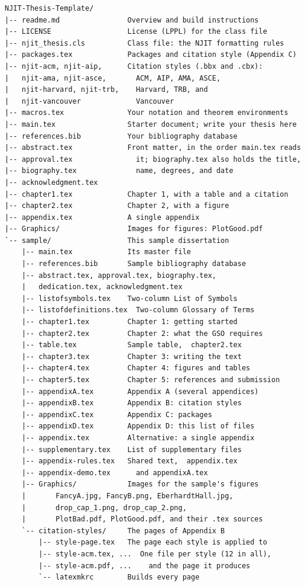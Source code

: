 {\footnotesize
\begin{verbatim}
NJIT-Thesis-Template/
|-- readme.md                Overview and build instructions
|-- LICENSE                  License (LPPL) for the class file
|-- njit_thesis.cls          Class file: the NJIT formatting rules
|-- packages.tex             Packages and citation style (Appendix C)
|-- njit-acm, njit-aip,      Citation styles (.bbx and .cbx):
|   njit-ama, njit-asce,       ACM, AIP, AMA, ASCE,
|   njit-harvard, njit-trb,    Harvard, TRB, and
|   njit-vancouver             Vancouver
|-- macros.tex               Your notation and theorem environments
|-- main.tex                 Starter document; write your thesis here
|-- references.bib           Your bibliography database
|-- abstract.tex             Front matter, in the order main.tex reads
|-- approval.tex               it; biography.tex also holds the title,
|-- biography.tex              name, degrees, and date
|-- acknowledgment.tex
|-- chapter1.tex             Chapter 1, with a table and a citation
|-- chapter2.tex             Chapter 2, with a figure
|-- appendix.tex             A single appendix
|-- Graphics/                Images for figures: PlotGood.pdf
`-- sample/                  This sample dissertation
    |-- main.tex             Its master file
    |-- references.bib       Sample bibliography database
    |-- abstract.tex, approval.tex, biography.tex,
    |   dedication.tex, acknowledgment.tex
    |-- listofsymbols.tex    Two-column List of Symbols
    |-- listofdefinitions.tex  Two-column Glossary of Terms
    |-- chapter1.tex         Chapter 1: getting started
    |-- chapter2.tex         Chapter 2: what the GSO requires
    |-- table.tex            Sample table,  chapter2.tex
    |-- chapter3.tex         Chapter 3: writing the text
    |-- chapter4.tex         Chapter 4: figures and tables
    |-- chapter5.tex         Chapter 5: references and submission
    |-- appendixA.tex        Appendix A (several appendices)
    |-- appendixB.tex        Appendix B: citation styles
    |-- appendixC.tex        Appendix C: packages
    |-- appendixD.tex        Appendix D: this list of files
    |-- appendix.tex         Alternative: a single appendix
    |-- supplementary.tex    List of supplementary files
    |-- appendix-rules.tex   Shared text,  appendix.tex
    |-- appendix-demo.tex      and appendixA.tex
    |-- Graphics/            Images for the sample's figures
    |       FancyA.jpg, FancyB.png, EberhardtHall.jpg,
    |       drop_cap_1.png, drop_cap_2.png,
    |       PlotBad.pdf, PlotGood.pdf, and their .tex sources
    `-- citation-styles/     The pages of Appendix B
        |-- style-page.tex   The page each style is applied to
        |-- style-acm.tex, ...  One file per style (12 in all),
        |-- style-acm.pdf, ...    and the page it produces
        `-- latexmkrc        Builds every page
\end{verbatim}
}

